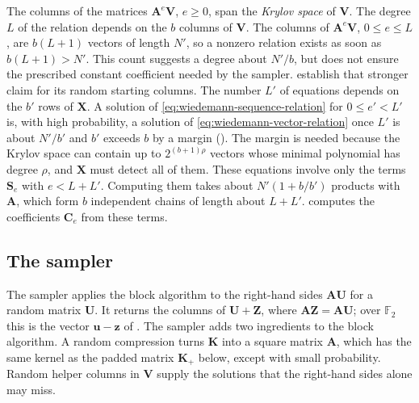 \documentclass[b5paper, 10pt, abstract=true, captions=tableheading]{scrartcl}
\theoremstyle{plain}
\theoremstyle{definition}
\newcommand{\FF}{\mathds{F}}
\renewcommand{\vec}[1]{\symbf{#1}}
\newcommand{\mat}[1]{\symbf{#1}}
\begin{document}
The columns of the matrices $\mat A^e\mat V$, $e\geq0$, span the
\emph{Krylov space} of $\mat V$. The degree $L$ of the relation depends on
the $b$ columns of $\mat V$. The columns of $\mat A^e\mat V$, $0\leq e\leq L$,
are $b(L+1)$ vectors of length $N'$, so a nonzero relation exists as soon
as $b(L+1)>N'$. This count suggests a degree about $N'/b$, but does not
ensure the prescribed constant coefficient needed by the sampler.
 establish that stronger
claim for its random starting columns. The
number $L'$ of equations depends on the $b'$ rows of $\mat X$. A solution of
\eqref{eq:wiedemann-sequence-relation} for $0\leq e'<L'$ is, with high
probability, a solution of \eqref{eq:wiedemann-vector-relation} once $L'$
is about $N'/b'$ and $b'$ exceeds $b$ by a margin
(). The margin is needed because the Krylov space
can contain up to $2^{(b+1)\rho}$ vectors whose minimal polynomial has
degree $\rho$, and $\mat X$ must detect all of them. These equations involve only the terms
$\mat S_e$ with $e<L+L'$. Computing them takes about $N'(1+b/b')$ products
with $\mat A$, which form $b$ independent chains of length about $L+L'$.
 computes the coefficients $\mat C_e$
from these terms.

\subsection{The sampler}
\label{subsec:wiedemann-sampler}
The sampler applies the block algorithm to the right-hand sides
$\mat A\mat U$ for a random matrix $\mat U$. It returns the columns of
$\mat U+\mat Z$, where $\mat A\mat Z=\mat A\mat U$; over $\FF_2$ this is
the vector $\vec u-\vec z$ of . The sampler
adds two ingredients to the block algorithm. A random compression turns
$\mat K$ into a square matrix $\mat A$, which has the same kernel as the
padded matrix $\mat K_+$ below, except with small probability. Random helper columns in $\mat V$ supply the
solutions that the right-hand sides alone may miss.
\end{document}
